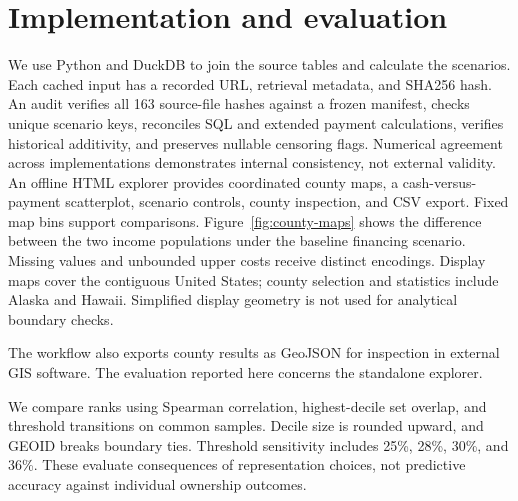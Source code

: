 \documentclass[conference,letterpaper]{IEEEtran}
\begin{document}
\section{Implementation and evaluation}
We use Python and DuckDB to join the source tables and calculate the scenarios. Each cached input has a recorded URL, retrieval metadata, and SHA256 hash. An audit verifies all 163 source-file hashes against a frozen manifest, checks unique scenario keys, reconciles SQL and extended payment calculations, verifies historical additivity, and preserves nullable censoring flags. Numerical agreement across implementations demonstrates internal consistency, not external validity. An offline HTML explorer provides coordinated county maps, a cash-versus-payment scatterplot, scenario controls, county inspection, and CSV export. Fixed map bins support comparisons. Figure~\ref{fig:county-maps} shows the difference between the two income populations under the baseline financing scenario. Missing values and unbounded upper costs receive distinct encodings. Display maps cover the contiguous United States; county selection and statistics include Alaska and Hawaii. Simplified display geometry is not used for analytical boundary checks.

The workflow also exports county results as GeoJSON for inspection in external GIS software. The evaluation reported here concerns the standalone explorer.

We compare ranks using Spearman correlation, highest-decile set overlap, and threshold transitions on common samples. Decile size is rounded upward, and GEOID breaks boundary ties. Threshold sensitivity includes 25\%, 28\%, 30\%, and 36\%. These evaluate consequences of representation choices, not predictive accuracy against individual ownership outcomes.
\end{document}
